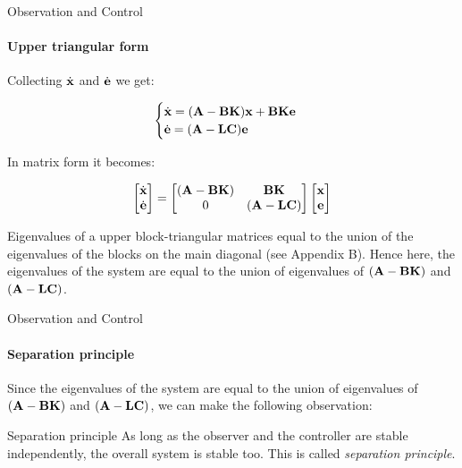 \documentclass{beamer}
\begin{document}
\begin{frame}{Observation and Control}
\framesubtitle{Upper triangular form}
\begin{flushleft}

Collecting $\dot {\mathbf{x}}$ and $\dot{\mathbf{e}}$ we get:

\begin{equation}
\begin{cases}
\dot {\mathbf{x}} = (\mathbf{A}-\mathbf{B}\mathbf{K}) \mathbf{x} +  \mathbf{B}\mathbf{K}\mathbf{e} \\
\dot{\mathbf{e}} = 
(\mathbf{A}  - \mathbf{L}\mathbf{C})\mathbf{e}
\end{cases}
\end{equation}

In matrix form it becomes:

\begin{equation}
\begin{bmatrix}
\dot {\mathbf{x}} \\
\dot{\mathbf{e}}
\end{bmatrix}
=
\begin{bmatrix}
(\mathbf{A}-\mathbf{B}\mathbf{K}) & \mathbf{B}\mathbf{K} \\
0 & (\mathbf{A}  - \mathbf{L}\mathbf{C})
\end{bmatrix}
\begin{bmatrix}
\mathbf{x} \\
\mathbf{e}
\end{bmatrix}
\end{equation}

Eigenvalues of a upper block-triangular matrices equal to the union of the eigenvalues of the blocks on the main diagonal (see Appendix B). Hence here, the eigenvalues of the system are equal to the union of eigenvalues of $(\mathbf{A}-\mathbf{B}\mathbf{K})$ and $(\mathbf{A}  - \mathbf{L}\mathbf{C})$. 

\end{flushleft}
\end{frame}



\begin{frame}{Observation and Control}
\framesubtitle{Separation principle}
\begin{flushleft}
 
Since the eigenvalues of the system are equal to the union of eigenvalues of $(\mathbf{A}-\mathbf{B}\mathbf{K})$ and $(\mathbf{A}  - \mathbf{L}\mathbf{C})$, we can make the following observation:

\bigskip

\begin{alertblock}{Separation principle}
As long as the observer and the controller are stable independently, the overall system is stable too. This is called \emph{separation principle}.
\end{alertblock}

\end{flushleft}
\end{frame}
\end{document}
